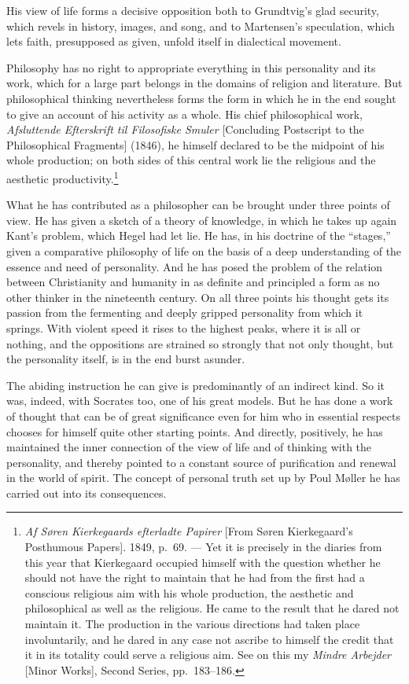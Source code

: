 \documentclass[12pt,a4paper]{book}
\newcommand{\opage}[1]{\marginnote{\footnotesize\textit{[#1]}}}
\begin{document}
His view of life forms a decisive opposition both to Grundtvig's glad security, which
revels in history, images, and song, and to Martensen's speculation, which lets faith,
presupposed as given, unfold itself in dialectical movement.

Philosophy has no right to appropriate everything in this personality and its work, which
for a large part belongs in the domains of religion and literature. But philosophical
thinking nevertheless forms the form in which he in the end sought to give an account of
his activity as a whole. His chief philosophical work, \emph{Afsluttende Efterskrift til
Filosofiske Smuler} [Concluding Postscript to the Philosophical Fragments] (1846), he
himself declared to be the midpoint of his whole production; on both sides of this central
work lie the religious and the aesthetic productivity.\footnote{\emph{Af Søren Kierkegaards
efterladte Papirer} [From Søren Kierkegaard's Posthumous Papers]. 1849, p.~69. --- Yet it
is precisely in the diaries from this year that Kierkegaard occupied himself with the
question whether he should not have the right to maintain that he had from the first had a
conscious religious aim with his whole production, the aesthetic and philosophical as well
as the religious. He came to the result that he dared not maintain it. The production in
the various directions had taken place involuntarily, and he dared in any case not ascribe
to himself the credit that it in its totality could serve a religious aim. See on this my
\emph{Mindre Arbejder} [Minor Works], Second Series, pp.~183--186.}

\opage{148}What he has contributed as a philosopher can be brought under three points of view. He has
given a sketch of a theory of knowledge, in which he takes up again Kant's problem, which
Hegel had let lie. He has, in his doctrine of the ``stages,'' given a comparative
philosophy of life on the basis of a deep understanding of the essence and need of
personality. And he has posed the problem of the relation between Christianity and humanity
in as definite and principled a form as no other thinker in the nineteenth century. On all
three points his thought gets its passion from the fermenting and deeply gripped
personality from which it springs. With violent speed it rises to the highest peaks, where
it is all or nothing, and the oppositions are strained so strongly that not only thought,
but the personality itself, is in the end burst asunder.

The abiding instruction he can give is predominantly of an indirect kind. So it was,
indeed, with Socrates too, one of his great models. But he has done a work of thought that
can be of great significance even for him who in essential respects chooses for himself
quite other starting points. And directly, positively, he has maintained the inner
connection of the view of life and of thinking with the personality, and thereby pointed to
a constant source of purification and renewal in the world of spirit. The concept of
personal truth set up by Poul Møller he has carried out into its consequences.
\end{document}
